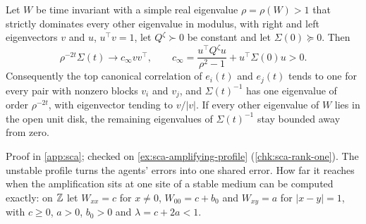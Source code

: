 \begin{proposition}\label{prop:sca-rank-one}
Let $W$ be time invariant with a simple real eigenvalue $\rho=\rho(W)>1$ that strictly dominates every other eigenvalue in modulus, with right and left eigenvectors $v$ and $u$, $u^\top v=1$, let $Q^\zeta\succ0$ be constant and let $\Sigma(0)\succeq0$. Then
\begin{equation}\label{eq:sca-rank-one}
\rho^{-2t}\Sigma(t)\to c_\infty vv^\top,\qquad c_\infty=\frac{u^\top Q^\zeta u}{\rho^2-1}+u^\top\Sigma(0)u>0.
\end{equation}
Consequently the top canonical correlation of $e_i(t)$ and $e_j(t)$ tends to one for every pair with nonzero blocks $v_i$ and $v_j$, and $\Sigma(t)^{-1}$ has one eigenvalue of order $\rho^{-2t}$, with eigenvector tending to $v/|v|$. If every other eigenvalue of $W$ lies in the open unit disk, the remaining eigenvalues of $\Sigma(t)^{-1}$ stay bounded away from zero.
\end{proposition}
Proof in \cref{app:sca}; checked on \cref{ex:sca-amplifying-profile} (\cref{chk:sca-rank-one}). The unstable profile turns the agents' errors into one shared error. How far it reaches when the amplification sits at one site of a stable medium can be computed exactly: on $\mathbb{Z}$ let $W_{xx}=c$ for $x\neq0$, $W_{00}=c+b_0$ and $W_{xy}=a$ for $|x-y|=1$, with $c\ge0$, $a>0$, $b_0>0$ and $\lambda=c+2a<1$.

